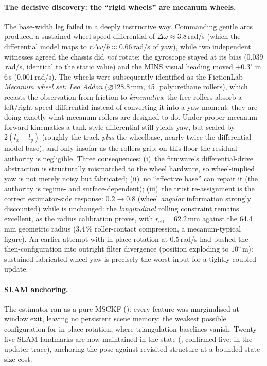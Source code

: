 \paragraph{The decisive discovery: the ``rigid wheels'' are mecanum
wheels.} The base-width leg failed in a deeply instructive way. Commanding
gentle arcs produced a sustained wheel-speed differential of
$\Delta\omega \approx 3.8$\,rad/s (which the differential model maps to
$r\Delta\omega/b \approx 0.66$\,rad/s of yaw), while two independent
witnesses agreed the chassis did \emph{not} rotate: the gyroscope stayed at
its bias ($0.039$\,rad/s, identical to the static value) and the MINS visual
heading moved $+0.3^\circ$ in 6\,s ($0.001$\,rad/s). The wheels were
subsequently identified as the FictionLab \emph{Mecanum wheel set: Leo
Addon} ($\varnothing$128.8\,mm, 45$^\circ$ polyurethane rollers), which
recasts the observation from friction to \emph{kinematics}: the free rollers
absorb a left/right speed differential instead of converting it into a yaw
moment: they are doing exactly what mecanum rollers are designed to do.
Under proper mecanum forward kinematics a tank-style differential still
yields yaw, but scaled by $2(l_x+l_y)$ (roughly the track \emph{plus} the
wheelbase, nearly twice the differential-model base), and only insofar as
the rollers grip; on this floor the residual authority is negligible. Three
consequences: (i)~the firmware's differential-drive abstraction is
structurally mismatched to the wheel hardware, so wheel-implied yaw is not
merely noisy but fabricated; (ii)~no ``effective base'' can repair it (the
authority is regime- and surface-dependent); (iii)~the trust re-assignment
is the correct estimator-side response: 
$0.2 \rightarrow 0.8$ (wheel \emph{angular} information strongly
discounted) while  is unchanged: the \emph{longitudinal}
rolling constraint remains excellent, as the radius calibration proves, with
$r_{\mathrm{eff}} = 62.2$\,mm against the 64.4\,mm geometric radius
(3.4\,\% roller-contact compression, a mecanum-typical figure). An earlier
attempt with in-place rotation at 0.5\,rad/s had pushed the
then-configuration into outright filter divergence (position exploding to
$10^5$\,m): sustained fabricated wheel yaw is precisely the worst input
for a tightly-coupled update.

\paragraph{SLAM anchoring.} The estimator ran as a pure MSCKF
(): every feature was marginalised at window exit,
leaving no persistent scene memory: the weakest possible configuration for
in-place rotation, where triangulation baselines vanish. Twenty-five SLAM
landmarks are now maintained in the state (, confirmed
live:  in the updater trace), anchoring the pose against
revisited structure at a bounded state-size cost.

